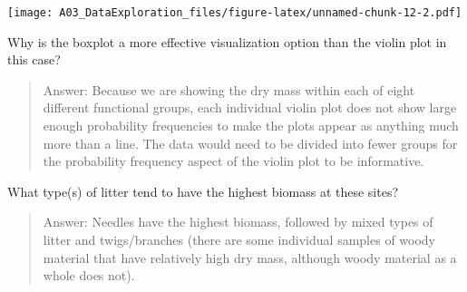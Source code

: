 \documentclass[]{article}
\begin{document}
\texttt{[image: A03\_DataExploration\_files/figure-latex/unnamed-chunk-12-2.pdf]}

Why is the boxplot a more effective visualization option than the violin
plot in this case?

\begin{quote}
Answer: Because we are showing the dry mass within each of eight
different functional groups, each individual violin plot does not show
large enough probability frequencies to make the plots appear as
anything much more than a line. The data would need to be divided into
fewer groups for the probability frequency aspect of the violin plot to
be informative.
\end{quote}

What type(s) of litter tend to have the highest biomass at these sites?

\begin{quote}
Answer: Needles have the highest biomass, followed by mixed types of
litter and twigs/branches (there are some individual samples of woody
material that have relatively high dry mass, although woody material as
a whole does not).
\end{quote}
\end{document}
